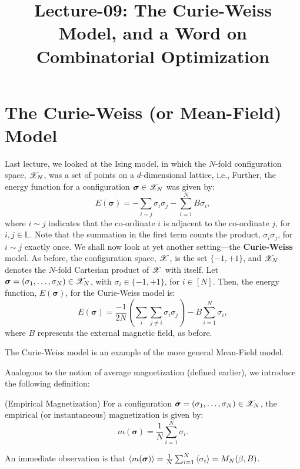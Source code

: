 \documentclass[letterpaper,english,10pt]{article}
\title{Lecture-09: The Curie-Weiss Model, and a Word on Combinatorial Optimization}
\begin{document}
\maketitle
\section{The Curie-Weiss (or Mean-Field) Model}

Last lecture, we looked at the Ising model, in which the $N$-fold configuration space, $\mathscr{X}_{N}$, was a set of points on a $d$-dimensional lattice, i.e., 
Further, the energy function for a configuration $\bm{\sigma}\in \mathscr{X}_{N}$ was given by:
\begin{equation*}
    E(\bm{\sigma}) = -\sum_{i\sim j}\sigma_{i}\sigma_j - \sum_{i=1}^{N}B\sigma_i,
\end{equation*}
where $i\sim j$ indicates that the co-ordinate $i$ is adjacent to the co-ordinate $j$, for $i,j\in \mathbb{L}$. Note that the summation in the first term counts the product, $\sigma_i\sigma_j$, for $i\sim j$ exactly once.
We shall now look at yet another setting---the \textbf{Curie-Weiss} model.
As before, the configuration space, $\mathscr{X}$, is the set $\{-1,+1\}$, and $\mathscr{X}_{N}$ denotes the $N$-fold Cartesian product of $\mathscr{X}$ with itself. Let $\bm{\sigma} = (\sigma_1,\ldots,\sigma_N)\in \mathscr{X}_{N}$, with $\sigma_i \in \{-1,+1\}$, for $i\in [N]$. Then, the energy function, $E(\bm{\sigma})$, for the Curie-Weiss model is:
\begin{equation}\label{energyeq}
E(\bm{\sigma}) = \frac{-1}{2N}\left(\sum_{i}\sum_{j\neq i}\sigma_i\sigma_j\right) - B\sum_{i=1}^{N}\sigma_i,
\end{equation}
where $B$ represents the external magnetic field, as before.
\begin{rem}
The Curie-Weiss model is an example of the more general Mean-Field model.
\end{rem}
Analogous to the notion of average magnetization (defined earlier), we introduce the following definition:
\begin{defn}(Empirical Magnetization)
For a configuration $\bm{\sigma}=(\sigma_1,\ldots,\sigma_N)\in \mathscr{X}_{N}$, the empirical (or instantaneous) magnetization is given by:
\begin{equation*}
    m(\bm{\sigma}) = \frac{1}{N}\sum_{i=1}^{N}\sigma_i.
\end{equation*}
\end{defn}
An immediate observation is that $\left\langle m(\bm{\sigma})\right\rangle = \frac{1}{N}\sum_{i=1}^{N}\left\langle\sigma_i\right\rangle = M_{N}(\beta,B)$.
\end{document}
